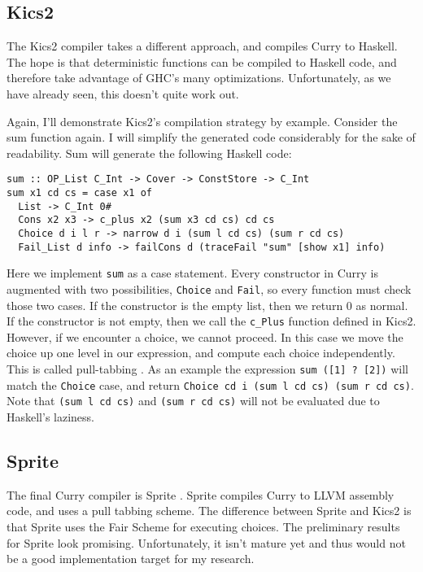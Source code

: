 \subsection{Kics2}

The Kics2 compiler takes a different approach, and compiles Curry to Haskell.
The hope is that deterministic functions can be compiled to Haskell code,
and therefore take advantage of GHC's many optimizations.
Unfortunately, as we have already seen, this doesn't quite work out.

Again, I'll demonstrate Kics2's compilation strategy by example.
Consider the sum function again.
I will simplify the generated code considerably for the sake of readability.
Sum will generate the following Haskell code:

\begin{verbatim}
sum :: OP_List C_Int -> Cover -> ConstStore -> C_Int
sum x1 cd cs = case x1 of
  List -> C_Int 0#
  Cons x2 x3 -> c_plus x2 (sum x3 cd cs) cd cs
  Choice d i l r -> narrow d i (sum l cd cs) (sum r cd cs)
  Fail_List d info -> failCons d (traceFail "sum" [show x1] info)

\end{verbatim}

Here we implement \texttt{sum} as a case statement.
Every constructor in Curry is augmented with two possibilities, \texttt{Choice} and \texttt{Fail},
so every function must check those two cases.
If the constructor is the empty list, then we return 0 as normal.
If the constructor is not empty, then we call the \texttt{c\_Plus} function defined in Kics2.
However, if we encounter a choice, we cannot proceed.
In this case we move the choice up one level in our expression, and compute each choice independently.
This is called pull-tabbing \cite{Antoy11ICLP}.
As an example the expression \texttt{sum ([1] ? [2])} will match the \texttt{Choice} case, and return 
\texttt{Choice cd i (sum l cd cs) (sum r cd cs)}.
Note that \texttt{(sum l cd cs)} and \texttt{(sum r cd cs)} will not be evaluated due to Haskell's laziness.



\subsection{Sprite}
The final Curry compiler is Sprite \cite{AntoyJost16LOPSTR}.
Sprite compiles Curry to LLVM assembly code, and uses a pull tabbing scheme.
The difference between Sprite and Kics2 is that Sprite uses the Fair Scheme \cite{fair_scheme} for executing choices.
The preliminary results for Sprite look promising. 
Unfortunately,  it isn't mature yet and thus would not be a good implementation target for my research.


